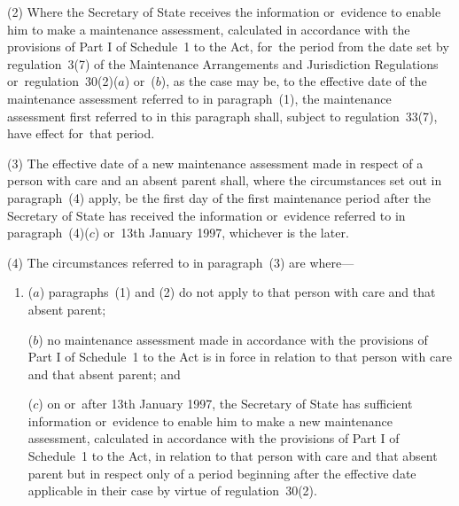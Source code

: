 \documentclass[a4paper,12pt]{article}
\begin{document}

(2) Where 
the Secretary of State  %
receives the information or~evidence to enable him to make a maintenance assessment, calculated in accordance with the provisions of Part I of Schedule~1 to the Act, for~the period from the date set by regulation~3(7) of the Maintenance Arrangements and Jurisdiction Regulations or~regulation~30(2)($a$) or~($b$), as the case may be, to the effective date of the maintenance assessment referred to in paragraph~(1), the maintenance assessment first referred to in this paragraph shall, subject to regulation~33(7), have effect for~that period.

(3) The effective date of a new maintenance assessment made in respect of a person with care and an absent parent shall, where the circumstances set out in paragraph~(4) apply, be the first day of the first maintenance period after the 
Secretary of State  %
has received the information or~evidence referred to in paragraph~(4)($c$) or~13th January 1997, whichever is the later.

(4) The circumstances referred to in paragraph~(3) are where—
\begin{enumerate}\item[]
($a$) paragraphs~(1) and (2) do not apply to that person with care and that absent parent;

($b$) no maintenance assessment made in accordance with the provisions of Part I of Schedule~1 to the Act is in force in relation to that person with care and that absent parent; and

($c$) on or~after 13th January 1997, 
the Secretary of State  %
has sufficient information or~evidence to enable him to make a new maintenance assessment, calculated in accordance with the provisions of Part I of Schedule~1 to the Act, in relation to that person with care and that absent parent but in respect only of a period beginning after the effective date applicable in their case by virtue of regulation~30(2).
\end{enumerate}
\end{document}
